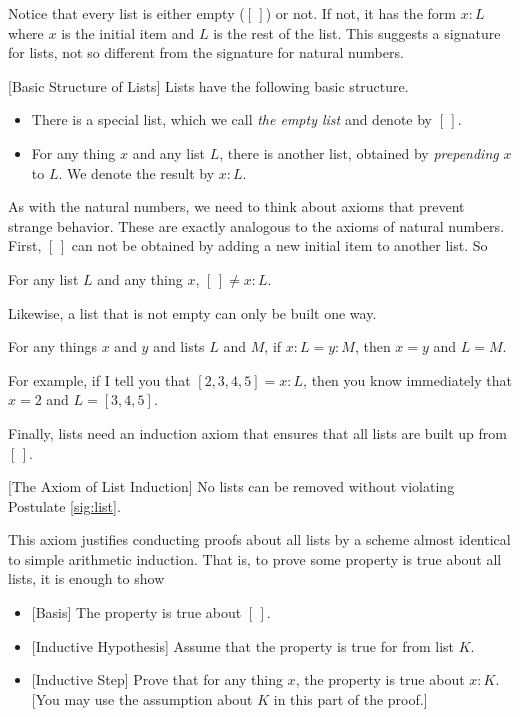 Notice that every list is either empty ($[\,]$) or not. If not, it has
the form $x:L$ where $x$ is the initial item and $L$
is the rest of the list. This suggests a signature for lists, not so different from
the signature for natural numbers.

\begin{postulate}\label{sig:list}[Basic Structure of Lists]
	Lists have the following basic structure.
	  \begin{itemize}
	  \item There is a special list, which we call \emph{the empty list} and denote by $[\,]$.
	  \item For any thing $x$ and any list $L$, there is another list, obtained by \emph{prepending} $x$ to $L$. We denote
	  the result by $x:L$.
	  \end{itemize}
\end{postulate}

As with the natural numbers, we need to think about axioms that prevent strange behavior. These are exactly analogous to the
axioms of natural numbers. First, $[\,]$ can not be obtained by adding a new initial item to another list. So

\begin{postulate}
	For any list $L$ and any thing $x$, $[\,]\neq x:L$.
\end{postulate}

Likewise, a list that is not empty can only be built one way.

\begin{postulate}
	For any things $x$ and $y$ and lists $L$ and $M$, if $x:L = y:M$, then $x=y$ and $L=M$.
\end{postulate}

For example, if I tell you that $[2,3,4,5] = x:L$, then you know immediately that $x=2$ and $L=[3,4,5]$.

Finally, lists need an induction axiom that ensures that all lists are built up from $[\,]$.


\begin{postulate}\label{ax:ListInd}
	[The Axiom of List Induction] No lists can be removed without violating Postulate \ref{sig:list}.
\end{postulate}

This axiom justifies conducting proofs about all lists by a scheme almost identical to simple arithmetic induction.
That is, to prove some property is true about all lists, it is enough to show
\begin{itemize}
\item{}[Basis] The property is true about $[\,]$.
\item{}[Inductive Hypothesis] Assume that the property is true for from list $K$.
\item{}[Inductive Step] Prove that for any thing $x$, the property is true about $x:K$. [You may use the
  assumption about $K$ in this part of the proof.]
\end{itemize}

